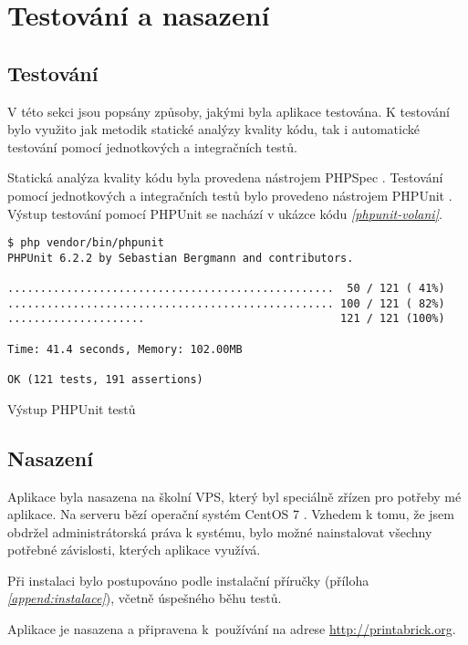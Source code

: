 \chapter{Testování a nasazení}

\section{Testování}
V této sekci jsou popsány způsoby, jakými byla aplikace testována. K testování bylo využito jak metodik statické analýzy kvality kódu, tak i automatické testování pomocí jednotkových a integračních testů.

Statická analýza kvality kódu byla provedena nástrojem PHPSpec \autocite{phpspec}. Testování pomocí jednotkových a integračních testů bylo provedeno nástrojem PHPUnit \autocite{phpunit}.
Výstup testování pomocí PHPUnit se nachází v ukázce kódu \emph{\ref{phpunit-volani}}. 


\begin{listing}[htbp]
        \begin{verbatim}
$ php vendor/bin/phpunit 
PHPUnit 6.2.2 by Sebastian Bergmann and contributors.

..................................................  50 / 121 ( 41%)
.................................................. 100 / 121 ( 82%)
.....................                              121 / 121 (100%)

Time: 41.4 seconds, Memory: 102.00MB

OK (121 tests, 191 assertions)
        \end{verbatim}
    \caption{Výstup PHPUnit testů \label{phpunit-volani}}
\end{listing}





\section{Nasazení}
Aplikace byla nasazena na školní \gls{VPS}, který byl speciálně zřízen pro potřeby mé aplikace. Na serveru bězí operační systém CentOS 7 \autocite{centos}. Vzhedem k tomu, že jsem obdržel administrátorská práva k systému, bylo možné nainstalovat všechny potřebné závislosti, kterých aplikace využívá. 

Při instalaci bylo postupováno podle instalační příručky (příloha \emph{\ref{append:instalace}}), včetně úspešného běhu testů. 

Aplikace je nasazena a připravena k~používání na adrese \url{http://printabrick.org}. 


